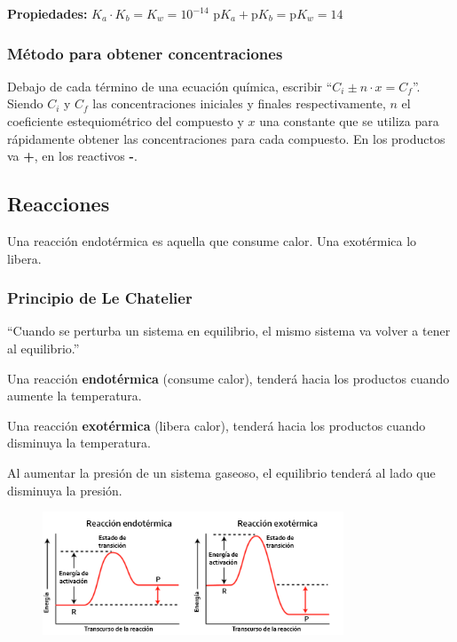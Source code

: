 \vspace{\baselineskip}
\noindent
\textbf{Propiedades:}
\hfil
$K_a \cdot K_b = K_w = 10^{-14}$
\hfil
$\text{p}K_a + \text{p}K_b = \text{p}K_w = 14$
\hfil


\subsubsection*{Método para obtener concentraciones}

Debajo de cada término de una ecuación química, escribir ``$C_i \pm n \cdot x = C_f$''. Siendo $C_i$ y $C_f$ las concentraciones iniciales y finales respectivamente, $n$ el coeficiente estequiométrico del compuesto y $x$ una constante que se utiliza para rápidamente obtener las concentraciones para cada compuesto. En los productos va \textbf{+}, en los reactivos \textbf{-}.


\newpage
\subsection*{Reacciones}

Una reacción endotérmica es aquella que consume calor. Una exotérmica lo libera.


\subsubsection*{Principio de Le Chatelier}

``Cuando se perturba un sistema en equilibrio, el mismo sistema va volver a tener al equilibrio.''

Una reacción \textbf{endotérmica} (consume calor), tenderá hacia los productos cuando aumente la temperatura.

Una reacción \textbf{exotérmica} (libera calor), tenderá hacia los productos cuando disminuya la temperatura.

Al aumentar la presión de un sistema gaseoso, el equilibrio tenderá al lado que disminuya la presión.

\begin{figure}[H]
    \centering
    \includegraphics[width=0.8\textwidth]{Images/energia-activacion.png}
\end{figure}
